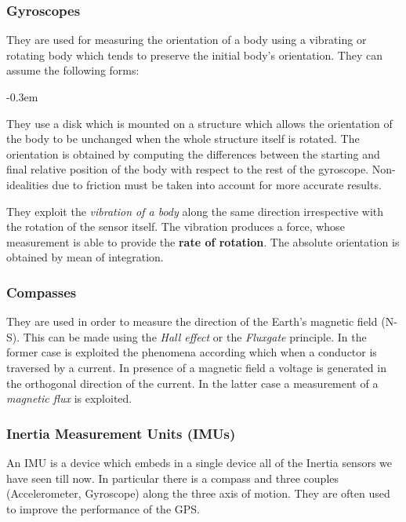 \subsubsection{Gyroscopes}
They are used for measuring the orientation of a body using a vibrating or rotating body which tends to preserve the initial body's orientation. They can assume the following forms: 
\begin{description}
    \itemsep-0.3em
    \item[Rotating Structure Gyroscopes] They use a disk which is mounted on a structure which allows the orientation of the body to be unchanged when the whole structure itself is rotated. The orientation is obtained by computing the differences between the starting and final relative position of the body with respect to the rest of the gyroscope. Non-idealities due to friction must be taken into account for more accurate results.
    \item[Vibrating Structure Gyroscopes] They exploit the \textit{vibration of a body} along the same direction irrespective with the rotation of the sensor itself. The vibration produces a force, whose measurement is able to provide the \textbf{rate of rotation}. The absolute orientation is obtained by mean of integration.
\end{description}

\subsubsection{Compasses}
They are used in order to measure the direction of the Earth's magnetic field (N-S). This can be made using the \textit{Hall effect} or the \textit{Fluxgate} principle. In the former case is exploited the phenomena according which when a conductor is traversed by a current. In presence of a magnetic field a voltage is generated in the orthogonal direction of the current. In the latter case a measurement of a \textit{magnetic flux} is exploited.

\subsubsection{Inertia Measurement Units (IMUs)}
An IMU is a device which embeds in a single device all of the Inertia sensors we have seen till now. In particular there is a compass and three couples (Accelerometer, Gyroscope) along the three axis of motion. They are often used to improve the performance of the GPS.

